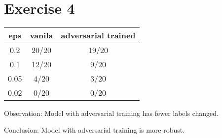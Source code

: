 
\section*{Exercise 4}

\begin{center}
\begin{tabular}{ |c|c|c| } 
 \hline
eps & vanila & adversarial trained  \\ 
\hline
 0.2 & 20/20 & 19/20 \\ 
 0.1 & 12/20 & 9/20 \\ 
 0.05 & 4/20 & 3/20 \\ 
 0.02 & 0/20 & 0/20 \\
 \hline
\end{tabular}
\end{center}

Observation: Model with adversarial training has fewer labels changed.

Conclusion: Model with adversarial training is more robust.
